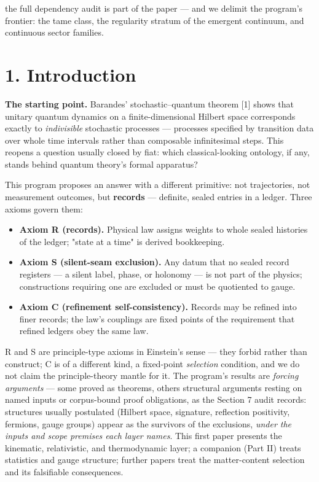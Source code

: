 \documentclass[11pt]{article}
\begin{document}
the full dependency audit is part of the paper — and we delimit the program's frontier: the tame class, the regularity stratum of the emergent continuum, and continuous sector families.

\section*{1. Introduction}
\textbf{The starting point.}  Barandes' stochastic–quantum theorem [1] shows that unitary quantum dynamics on a finite-dimensional Hilbert space corresponds exactly to \emph{indivisible} stochastic processes — processes specified by transition data over whole time intervals rather than composable infinitesimal steps.  This reopens a question usually closed by fiat: which classical-looking ontology, if any, stands behind quantum theory's formal apparatus?

This program proposes an answer with a different primitive: not trajectories, not measurement outcomes, but \textbf{records} — definite, sealed entries in a ledger.  Three axioms govern them:

\begin{itemize}
\item \textbf{Axiom R (records).}  Physical law assigns weights to whole sealed histories of the ledger; "state at a time" is derived bookkeeping.
\item \textbf{Axiom S (silent-seam exclusion).}  Any datum that no sealed record registers — a silent label, phase, or holonomy — is not part of the physics; constructions requiring one are excluded or must be quotiented to gauge.
\item \textbf{Axiom C (refinement self-consistency).}  Records may be refined into finer records; the law's couplings are fixed points of the requirement that refined ledgers obey the same law.
\end{itemize}
R and S are principle-type axioms in Einstein's sense — they forbid rather than construct; C is of a different kind, a fixed-point \emph{selection} condition, and we do not claim the principle-theory mantle for it.  The program's results are \emph{forcing arguments} — some proved as theorems, others structural arguments resting on named inputs or corpus-bound proof obligations, as the Section 7 audit records: structures usually postulated (Hilbert space, signature, reflection positivity, fermions, gauge groups) appear as the survivors of the exclusions, \emph{under the inputs and scope premises each layer names}.  This first paper presents the kinematic, relativistic, and thermodynamic layer; a companion (Part II) treats statistics and gauge structure; further papers treat the matter-content selection and its falsifiable consequences.
\end{document}
